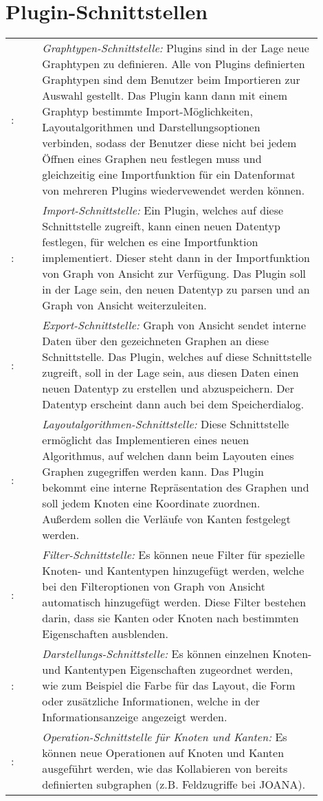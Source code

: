 \chapter{Plugin-Schnittstellen}
\label{ch:plugschnitt}


\setcounter{psnr}{10}
\newcommand{\psno}{\ifnum\value{psnr}<10 00\else\ifnum\value{psnr}<100 0\fi\fi\arabic{psnr}}
\newcommand\ps[2]{\namedlabel{s:#1}{/S\psno/}\addtocounter{psnr}{10}: & #2 \\ [1ex] }

\begin{tabular}{lp{0.9\linewidth}}
  \ps{graphtyp}{\textit{Graphtypen-Schnittstelle:} Plugins sind in der Lage neue Graphtypen zu definieren. Alle von Plugins definierten Graphtypen sind dem Benutzer beim Importieren zur Auswahl gestellt. Das Plugin kann dann mit einem Graphtyp bestimmte Import-Möglichkeiten, Layoutalgorithmen und Darstellungsoptionen verbinden, sodass der Benutzer diese nicht bei jedem Öffnen eines Graphen neu festlegen muss und gleichzeitig eine Importfunktion für ein Datenformat von mehreren Plugins wiedervewendet werden können.}
  \ps{import}{\textit{Import-Schnittstelle:} Ein Plugin, welches auf diese Schnittstelle zugreift, kann einen neuen Datentyp festlegen, für welchen es eine Importfunktion implementiert. Dieser steht dann in der Importfunktion von Graph von Ansicht zur Verfügung. Das Plugin soll in der Lage sein, den neuen Datentyp zu parsen und an Graph von Ansicht weiterzuleiten.}
  \ps{export}{\textit{Export-Schnittstelle:} Graph von Ansicht sendet interne Daten über den gezeichneten Graphen an diese Schnittstelle. Das Plugin, welches auf diese Schnittstelle zugreift, soll in der Lage sein, aus diesen Daten einen neuen Datentyp zu erstellen und abzuspeichern. Der Datentyp erscheint dann auch bei dem Speicherdialog.}
  \ps{layoutalgo}{\textit{Layoutalgorithmen-Schnittstelle:} Diese Schnittstelle ermöglicht das Implementieren eines neuen Algorithmus, auf welchen dann beim Layouten eines Graphen zugegriffen werden kann. Das Plugin bekommt eine interne Repräsentation des Graphen und soll jedem Knoten eine Koordinate zuordnen. Außerdem sollen die Verläufe von Kanten festgelegt werden.}
  \ps{filter}{\textit{Filter-Schnittstelle:} Es können neue Filter für spezielle Knoten- und Kantentypen hinzugefügt werden, welche bei den Filteroptionen von Graph von Ansicht automatisch hinzugefügt werden. Diese Filter bestehen darin, dass sie Kanten oder Knoten nach bestimmten Eigenschaften ausblenden.}
  \ps{darstellung}{\textit{Darstellungs-Schnittstelle:} Es können einzelnen Knoten- und Kantentypen Eigenschaften zugeordnet werden, wie zum Beispiel die Farbe für das Layout, die Form oder zusätzliche Informationen, welche in der Informationsanzeige angezeigt werden.}
  \ps{operationen}{\textit{Operation-Schnittstelle für Knoten und Kanten:} Es können neue Operationen auf Knoten und Kanten ausgeführt werden, wie das Kollabieren von bereits definierten \gls{subgraph}en (z.B. Feldzugriffe bei JOANA).}
\end{tabular}

